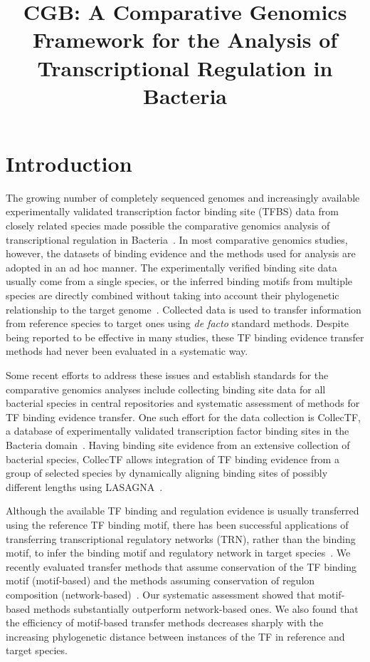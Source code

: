 \documentclass[12pt]{article}
\title{CGB: A Comparative Genomics Framework for the Analysis of
  Transcriptional Regulation in Bacteria}
\date{}
\begin{document}
\linenumbers
\doublespacing

\maketitle

\section{Introduction}

The growing number of completely sequenced genomes and increasingly available
experimentally validated transcription factor binding site (TFBS) data from
closely related species made possible the comparative genomics analysis of
transcriptional regulation in Bacteria~\cite{makarova2001conservation,
  rodionov2007comparative, babu2004structure}. In most comparative genomics
studies, however, the datasets of binding evidence and the methods used for
analysis are adopted in an ad hoc manner. The experimentally verified binding
site data usually come from a single species, or the inferred binding motifs
from multiple species are directly combined without taking into account their
phylogenetic relationship to the target genome~\cite{erill2004differences,
  novichkov2010regpredict, ravcheev2013genomic, leyn2014comparative,
  kazakov2009comparative, rodionov2008transcriptional}. Collected data is used
to transfer information from reference species to target ones using \textit{de
  facto} standard methods. Despite being reported to be effective in many
studies, these TF binding evidence transfer methods had never been evaluated in
a systematic way.

Some recent efforts to address these issues and establish standards for the
comparative genomics analyses include collecting binding site data for all
bacterial species in central repositories and systematic assessment of methods
for TF binding evidence transfer. One such effort for the data collection is
CollecTF, a database of experimentally validated transcription factor binding
sites in the Bacteria domain~\cite{kilic2013collectf}. Having binding site
evidence from an extensive collection of bacterial species, CollecTF allows
integration of TF binding evidence from a group of selected species by
dynamically aligning binding sites of possibly different lengths using
LASAGNA~\cite{lee2013lasagna}.

Although the available TF binding and regulation evidence is usually
transferred using the reference TF binding motif, there has been successful
applications of transferring transcriptional regulatory networks (TRN), rather
than the binding motif, to infer the binding motif and regulatory network in
target species~\cite{babu2008computational, novichkov2010regpredict}. We
recently evaluated transfer methods that assume conservation of the TF binding
motif (motif-based) and the methods assuming conservation of regulon
composition (network-based)~\cite{kilic2015assessment}. Our systematic
assessment showed that motif-based methods substantially outperform
network-based ones. We also found that the efficiency of motif-based transfer
methods decreases sharply with the increasing phylogenetic distance between
instances of the TF in reference and target species.
\end{document}
